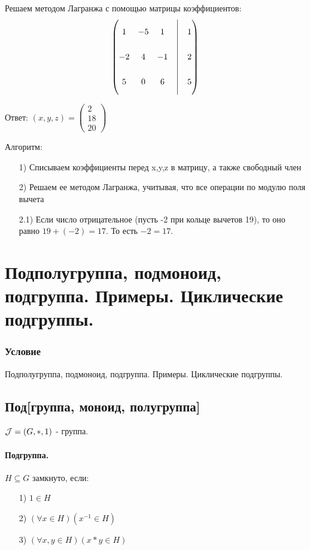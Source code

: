 \documentclass{report}
\begin{document}
Решаем методом Лагранжа с помощью матрицы коэффициентов:
$$
	\left(\begin{matrix}
			1  & -5 & 1  & \Biggr{|} & 1 \\
			-2 & 4  & -1 & \Biggr{|} & 2 \\
			5  & 0  & 6  & \Biggr{|} & 5 \\
		\end{matrix}\right)
$$

Ответ: $(x,y,z) = \begin{pmatrix}
		2 \\18\\20
	\end{pmatrix}$

Алгоритм:
\begin{itemize}
	\item[1)] Списываем коэффициенты перед x,y,z в матрицу, а также свободный член
	\item[2)] Решаем ее методом Лагранжа, учитывая, что все операции по модулю поля вычета
	\item[2.1)] Если число отрицательное (пусть -2 при кольце вычетов 19),
		то оно равно $19 + (-2) = 17$. То есть $-2 = 17$.
\end{itemize}

\newpage

\section{Подполугруппа, подмоноид, подгруппа. Примеры. Циклические подгруппы.}
\subsubsection{Условие}
Подполугруппа, подмоноид, подгруппа. Примеры. Циклические подгруппы.

\subsection{Под[группа, моноид, полугруппа]}
${\cal J} = (G, *, 1)$ - группа.

\paragraph*{Подгруппа.}
$H \subseteq G$ замкнуто, если:
\begin{itemize}
	\item[1)] $1 \in H$
	\item[2)] $(\forall x \in H)(x^{-1} \in H)$
	\item[3)] $(\forall x,y \in H)(x * y \in H)$
\end{itemize}
\end{document}
